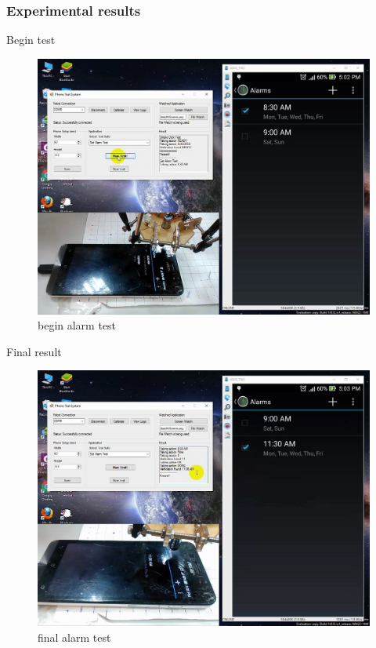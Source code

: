 \subsubsection{Experimental results}
Begin test
	\begin{figure}[H]
		\centering
		\includegraphics[scale=0.5]{Chapters/Fig/alarm_start.png}
		\caption{begin alarm test}
		\label{fig:alarm_start}
	\end{figure}

Final result
	\begin{figure}[H]
		\centering
		\includegraphics[scale=0.5]{Chapters/Fig/alarm_final.png}
		\caption{final alarm test}
		\label{fig:alarm_final}
	\end{figure}

